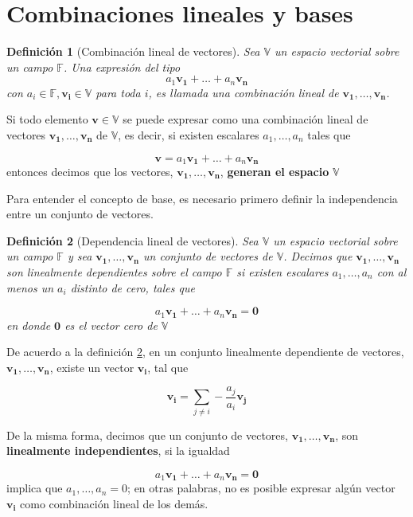\documentclass[11pt]{report}
\theoremstyle{break}
\newtheorem{definicion}{Definición}[chapter]
\theoremstyle{break}
\newcommand{\mbb}[1]{$\mathbb{#1}$}
\begin{document}
\section{Combinaciones lineales y bases}
\label{seccion:Combinaciones-lineales}
\begin{definicion}[Combinación lineal de vectores]
\label{definicion:combinacion-lineal-vectores}
Sea \mbb{V} un espacio vectorial sobre un campo \mbb{F}. Una expresión del tipo 
$$ a_1 \bm{v_1} + \ldots + a_n \bm{v_n}$$
con $a_i \in \mathbb{F}, \bm{v_i} \in \mathbb{V}$ para toda $i$, es llamada una combinación lineal de $\bm{v_1}, \ldots, \bm{v_n}$.
\end{definicion}

Si todo elemento $\bm{v} \in \mathbb{V}$ se puede expresar como una combinación lineal de vectores $\bm{v_1}, \ldots, \bm{v_n}$ de \mbb{V}, es decir, si existen escalares $a_1, \ldots, a_n$ tales que

$$ \bm{v} = a_1 \bm{v_1} + \ldots + a_n \bm{v_n} $$
entonces decimos que los vectores, $\bm{v_1}, \ldots, \bm{v_n}$, \textbf{generan el espacio} \mbb{V}

Para entender el concepto de base, es necesario primero definir la independencia entre un conjunto de vectores.

\begin{definicion}[Dependencia lineal de vectores]
\label{definicion:dependencia-lineal-vectores}
Sea \mbb{V} un espacio vectorial sobre un campo \mbb{F} y sea $\bm{v_1}, \ldots, \bm{v_n}$ un conjunto de vectores de \mbb{V}. Decimos que $\bm{v_1}, \ldots, \bm{v_n}$ son linealmente dependientes sobre el campo \mbb{F} si existen escalares $a_1, \ldots, a_n$ con al menos un $a_i$ distinto de cero, tales que

$$a_1 \bm{v_1} + \ldots + a_n \bm{v_n} = \bm{0}$$
en donde $\bm{0}$ es el vector cero de \mbb{V}
\end{definicion}

De acuerdo a la definición \ref{definicion:dependencia-lineal-vectores}, en un conjunto linealmente dependiente de vectores, $\bm{v_1}, \ldots, \bm{v_n}$, existe un vector $\bm{v_i}$, tal que 

$$ \bm{v_i} = \sum_{j \neq i} -\dfrac{a_j}{a_i} \bm{v_j}$$

De la misma forma, decimos que un conjunto de vectores, $\bm{v_1}, \ldots, \bm{v_n}$, son \textbf{linealmente independientes}, si la igualdad

$$a_1 \bm{v_1} + \ldots + a_n \bm{v_n} = \bm{0}$$
implica que $a_1, \ldots, a_n = 0$; en otras palabras, no es posible expresar algún vector $\bm{v_i}$ como combinación lineal de los demás.
\end{document}
